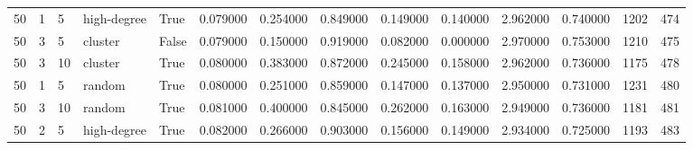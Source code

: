 \begin{table}
\begin{tabular}{llllllllllllll}
50 & 1 & 5 & high-degree & True & 0.079000 & 0.254000 & 0.849000 & 0.149000 & 0.140000 & 2.962000 & 0.740000 & 1202 & 474 \\
50 & 3 & 5 & cluster & False & 0.079000 & 0.150000 & 0.919000 & 0.082000 & 0.000000 & 2.970000 & 0.753000 & 1210 & 475 \\
50 & 3 & 10 & cluster & True & 0.080000 & 0.383000 & 0.872000 & 0.245000 & 0.158000 & 2.962000 & 0.736000 & 1175 & 478 \\
50 & 1 & 5 & random & True & 0.080000 & 0.251000 & 0.859000 & 0.147000 & 0.137000 & 2.950000 & 0.731000 & 1231 & 480 \\
50 & 3 & 10 & random & True & 0.081000 & 0.400000 & 0.845000 & 0.262000 & 0.163000 & 2.949000 & 0.736000 & 1181 & 481 \\
50 & 2 & 5 & high-degree & True & 0.082000 & 0.266000 & 0.903000 & 0.156000 & 0.149000 & 2.934000 & 0.725000 & 1193 & 483 \\
\bottomrule
\end{tabular}
\end{table}
